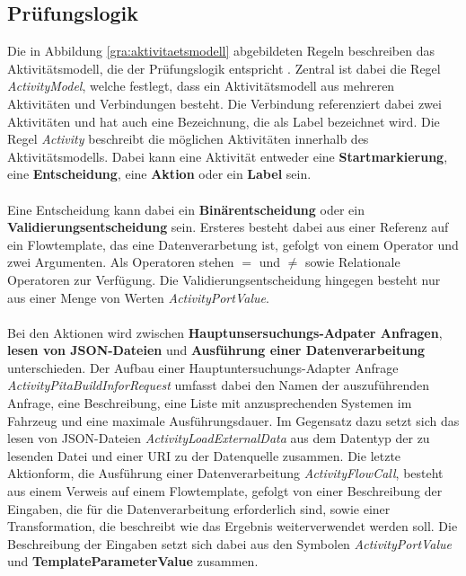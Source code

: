     \subsection{Prüfungslogik}
    \label{Prüfungslogik}
    Die in Abbildung \cref{gra:aktivitaetsmodell} abgebildeten Regeln beschreiben das Aktivitätsmodell, die der Prüfungslogik entspricht \cite{99}.
    Zentral ist dabei die Regel \textit{ActivityModel}, welche festlegt, dass ein Aktivitätsmodell aus mehreren Aktivitäten und Verbindungen besteht.
    Die Verbindung referenziert dabei zwei Aktivitäten und hat auch eine Bezeichnung, die als Label bezeichnet wird.
    Die Regel \textit{Activity} beschreibt die möglichen Aktivitäten innerhalb des Aktivitätsmodells. 
    Dabei kann eine Aktivität entweder eine \textbf{Startmarkierung}, eine \textbf{Entscheidung}, eine \textbf{Aktion} oder ein \textbf{Label} sein.\\
    \\
    Eine Entscheidung kann dabei ein \textbf{Binärentscheidung} oder ein \textbf{Validierungsentscheidung} sein.
    Ersteres besteht dabei aus einer Referenz auf ein Flowtemplate, das eine Datenverarbetung ist, gefolgt von einem Operator und zwei Argumenten. 
    Als Operatoren stehen $=$ und $\neq$ sowie Relationale Operatoren zur Verfügung.
    Die Validierungsentscheidung hingegen besteht nur aus einer Menge von Werten \textit{ActivityPortValue}.\\
    \\
    Bei den Aktionen wird zwischen \textbf{Hauptunsersuchungs-Adpater Anfragen}, \textbf{lesen von JSON-Dateien} und \textbf{Ausführung einer Datenverarbeitung } unterschieden.
    Der Aufbau einer Hauptuntersuchungs-Adapter Anfrage \textit{ActivityPitaBuildInforRequest} umfasst dabei den Namen der auszuführenden Anfrage, eine Beschreibung, eine Liste mit anzusprechenden Systemen im Fahrzeug und eine maximale Ausführungsdauer.
    Im Gegensatz dazu setzt sich das lesen von JSON-Dateien \textit{ActivityLoadExternalData}  aus dem Datentyp der zu lesenden Datei und einer URI zu der Datenquelle zusammen.
    Die letzte Aktionform, die Ausführung einer Datenverarbeitung \textit{ActivityFlowCall}, besteht aus einem Verweis auf einem Flowtemplate, gefolgt von einer Beschreibung der Eingaben, die für die Datenverarbeitung erforderlich sind, sowie einer Transformation, die beschreibt wie das Ergebnis weiterverwendet werden soll.    
    Die Beschreibung der Eingaben setzt sich dabei aus den Symbolen \textit{ActivityPortValue} und \textbf{TemplateParameterValue} zusammen.\\
